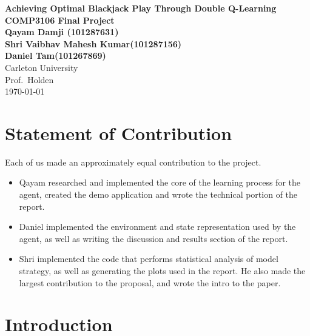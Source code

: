\documentclass[10pt]{article}
\theoremstyle{definition}
\begin{document}
\begin{titlepage}
    \begin{center}
        \vspace*{1cm}
        \textbf{Achieving Optimal Blackjack Play Through Double Q-Learning}\\
        \textbf{COMP3106 Final Project}\\
        \textbf{Qayam Damji (101287631)}\\
        \textbf{Shri Vaibhav Mahesh Kumar(101287156)}\\
        \textbf{Daniel Tam(101267869)}\\
        \vspace{0.8cm}
        Carleton University\\
        Prof.\ Holden\\
        \today
    \end{center}
\end{titlepage}

\tableofcontents
\newpage

\section{Statement of Contribution}
Each of us made an approximately equal contribution to the project. 
\begin{itemize}
    \item Qayam researched and implemented the core of the learning process for the agent, created the demo application and wrote the technical portion of the report.
    \item Daniel implemented the environment and state representation used by the agent, as well as writing the discussion and results section of the report.
    \item Shri implemented the code that performs statistical analysis of model strategy, as well as generating the plots used in the report. He also made the largest contribution to the proposal, and wrote the intro to the paper.
\end{itemize}
\section{Introduction}
\end{document}
